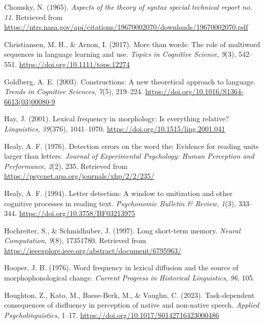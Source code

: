 \documentclass[
  man,floatsintext]{apa6}
\newlength{\cslhangindent}
\newenvironment{CSLReferences}[2] %
 {\begin{list}{}{%
  \setlength{\itemindent}{0pt}
  \setlength{\leftmargin}{0pt}
  \setlength{\parsep}{0pt}
  \ifodd #1
   \setlength{\leftmargin}{\cslhangindent}
   \setlength{\itemindent}{-1\cslhangindent}
  \fi
  \setlength{\itemsep}{#2\baselineskip}}}
 {\end{list}}
\begin{document}
\begin{CSLReferences}{1}{0}
Chomsky, N. (1965). \emph{Aspects of the theory of syntax special technical report no. 11}. Retrieved from \url{https://ntrs.nasa.gov/api/citations/19670002070/downloads/19670002070.pdf}

Christiansen, M. H., \& Arnon, I. (2017). More than words: The role of multiword sequences in language learning and use. \emph{Topics in Cognitive Science}, \emph{9}(3), 542--551. \url{https://doi.org/10.1111/tops.12274}

Goldberg, A. E. (2003). Constructions: A new theoretical approach to language. \emph{Trends in Cognitive Sciences}, \emph{7}(5), 219--224. \url{https://doi.org/10.1016/S1364-6613(03)00080-9}

Hay, J. (2001). Lexical frequency in morphology: Is everything relative? \emph{Linguistics}, \emph{39}(376), 1041--1070. \url{https://doi.org/10.1515/ling.2001.041}

Healy, A. F. (1976). Detection errors on the word the: Evidence for reading units larger than letters. \emph{Journal of Experimental Psychology: Human Perception and Performance}, \emph{2}(2), 235. Retrieved from \url{https://psycnet.apa.org/journals/xhp/2/2/235/}

Healy, A. F. (1994). Letter detection: A window to unitization and other cognitive processes in reading text. \emph{Psychonomic Bulletin \& Review}, \emph{1}(3), 333--344. \url{https://doi.org/10.3758/BF03213975}

Hochreiter, S., \& Schmidhuber, J. (1997). Long short-term memory. \emph{Neural Computation}, \emph{9}(8), 17351780. Retrieved from \url{https://ieeexplore.ieee.org/abstract/document/6795963/}

Hooper, J. B. (1976). Word frequency in lexical diffusion and the source of morphophonological change. \emph{Current Progress in Historical Linguistics}, \emph{96}, 105.

Houghton, Z., Kato, M., Baese-Berk, M., \& Vaughn, C. (2023). Task-dependent consequences of disfluency in perception of native and non-native speech. \emph{Applied Psycholinguistics}, 1--17. \url{https://doi.org/10.1017/S0142716423000486}


\end{CSLReferences}
\end{document}
